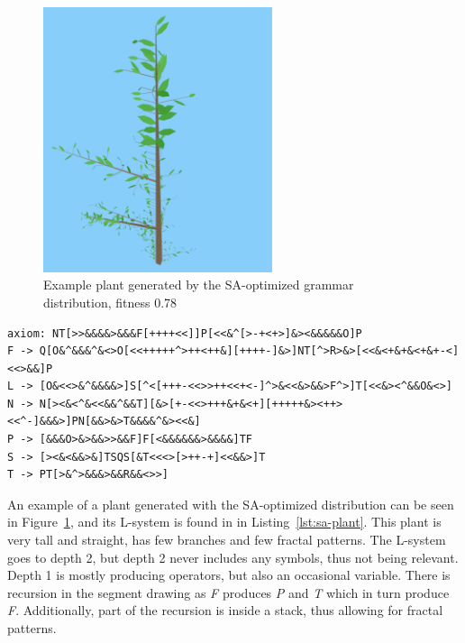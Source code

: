 \begin{figure}
    \centering
    \includegraphics[width=0.6\textwidth]{figures/sa-plant}
    \caption[Example plant generated by the SA-optimized grammar distribution]{Example plant generated by the SA-optimized grammar distribution, fitness 0.78}
    \label{fig:sa-plant}
\end{figure}

\begin{lstlisting}[caption=L-system representation of plant in Figure~\ref{fig:sa-plant}, label=lst:sa-plant, float]
axiom: NT[>>&&&&>&&&F[++++<<]]P[<<&^[>-+<+>]&><&&&&&O]P
F -> Q[O&^&&&^&<>O[<<+++++^>++<++&][++++-]&>]NT[^>R>&>[<<&<+&+&<+&+-<]<<>&&]P
L -> [O&<<>&^&&&&>]S[^<[+++-<<>>++<<+<-]^>&<<&>&&>F^>]T[<<&><^&&O&<>]
N -> N[><&<^&<<&&^&&T][&>[+-<<>+++&+&<+][+++++&><++><<^-]&&&>]PN[&&>&>T&&&&^&><<&]
P -> [&&&O>&>&&>>&&F]F[<&&&&&&>&&&&]TF
S -> [><&<&&>&]TSQS[&T<<<>[>++-+]<<&&>]T
T -> PT[>&^>&&&>&&R&&<>>]
\end{lstlisting}

An example of a plant generated with the SA-optimized distribution can be seen in Figure~\ref{fig:sa-plant}, and its L-system is found in in Listing~\ref{lst:sa-plant}.
This plant is very tall and straight, has few branches and few fractal patterns.
The L-system goes to depth 2, but depth 2 never includes any symbols, thus not being relevant.
Depth 1 is mostly producing operators, but also an occasional variable.
There is recursion in the segment drawing as \textit{F} produces \textit{P} and \textit{T} which in turn produce \textit{F}.
Additionally, part of the recursion is inside a stack, thus allowing for fractal patterns.

